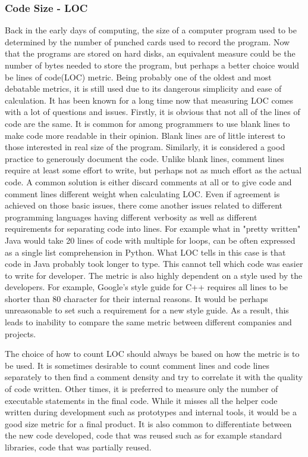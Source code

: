 \documentclass[11pt]{article}
\begin{document}
\subsubsection{Code Size - LOC}
\par
Back in the early days of computing, the size of a computer program used to be determined by the number of punched cards used to record the program.\cite{conte-et-al-1986} Now that the programs are stored on hard disks, an equivalent measure could be the number of bytes needed to store the program, but perhaps a better choice would be lines of code(LOC) metric. Being probably one of the oldest and most debatable metrics, it is still used due to its dangerous simplicity and ease of calculation. It has been known for a long time now that measuring LOC comes with a lot of questions and issues.\cite{conte-et-al-1986} Firstly, it is obvious that not all of the lines of code are the same. It is common for among programmers to use blank lines to make code more readable in their opinion. Blank lines are of little interest to those interested in real size of the program. Similarly, it is considered a good practice to generously document the code. Unlike blank lines, comment lines require at least some effort to write, but perhaps not as much effort as the actual code. A common solution is either discard comments at all or to give code and comment lines different weight when calculating LOC. Even if agreement is achieved on those basic issues, there come another issues related to different programming languages having different verbosity as well as different requirements for separating code into lines. For example what in "pretty written" Java would take 20 lines of code with multiple for loops, can be often expressed as a single list comprehension in Python. What LOC tells in this case is that code in Java probably took longer to type. This cannot tell which code was easier to write for developer. The metric is also highly dependent on a style used by the developers. For example, Google's style guide for C++ requires all lines to be shorter than 80 character for their internal reasons.\cite{google-cpp-style-guide} It would be perhaps unreasonable to set such a requirement for a new style guide. As a result, this leads to inability to compare the same metric between different companies and projects.
\par
The choice of how to count LOC should always be based on how the metric is to be used. It is sometimes desirable to count comment lines and code lines separately to then find a comment density and try to correlate it with the quality of code written. Other times, it is preferred to measure only the number of executable statements in the final code. While it misses all the helper code written during development such as prototypes and internal tools, it would be a good size metric for a final product. It is also common to differentiate between the new code developed, code that was reused such as for example standard libraries, code that was partially reused.
\end{document}
